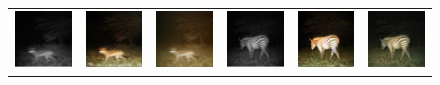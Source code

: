 \begin{figure}
\begin{tabularx}{\textwidth}{Y Y Y !{\space} Y Y Y}
        \includegraphics{gfx/conditional-diffusion-sampling-qual/nir_S2_B06_R1_PICT0128.jpg} & \includegraphics{gfx/conditional-diffusion-sampling-qual/cyclegan_S2_B06_R1_PICT0128_fake.png} & \includegraphics{gfx/conditional-diffusion-sampling-qual/diffusion_S2_B06_R1_PICT0128.png} & \includegraphics{gfx/conditional-diffusion-sampling-qual/nir_S2_B06_R1_PICT0279.jpg} & \includegraphics{gfx/conditional-diffusion-sampling-qual/cyclegan_S2_B06_R1_PICT0279_fake.png} & \includegraphics{gfx/conditional-diffusion-sampling-qual/diffusion_S2_B06_R1_PICT0279.png} \\

\end{tabularx}
\end{figure}
